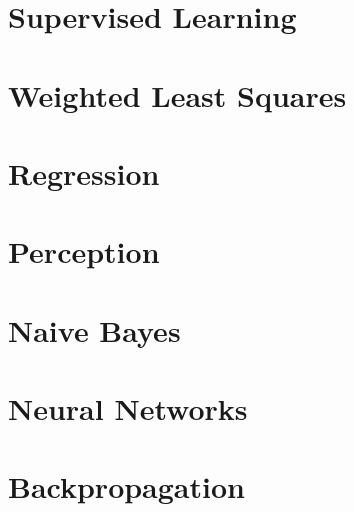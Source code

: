 \documentclass[../main.tex]{subfiles}
\begin{document}
\section{Supervised Learning}

\section{Weighted Least Squares}

\section{Regression}

\section{Perception}

\section{Naive Bayes}

\section{Neural Networks}

\section{Backpropagation}
\end{document}
